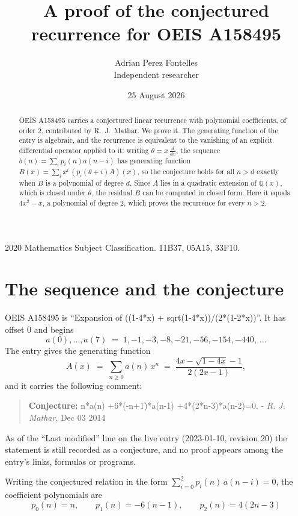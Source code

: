 \documentclass[11pt,a4paper]{article}
\title{A proof of the conjectured recurrence for OEIS A158495}
\author{Adrian Perez Fontelles\\ \small Independent researcher}
\date{25 August 2026}
\theoremstyle{plain}
\theoremstyle{definition}
\begin{document}
\maketitle

\begin{abstract}
OEIS A158495 carries a conjectured linear recurrence with polynomial coefficients, of
order 2, contributed by R.~J.~Mathar. We prove it. The generating function of the
entry is algebraic, and the recurrence is equivalent to the vanishing of an explicit
differential operator applied to it: writing $\theta=x\,\frac{d}{dx}$, the sequence
$b(n)=\sum_{i}p_{i}(n)a(n-i)$ has generating function
$B(x)=\sum_{i}x^{i}\,(p_{i}(\theta+i)A)(x)$, so the conjecture holds for all $n>d$ exactly
when $B$ is a polynomial of degree $d$. Since $A$ lies in a quadratic extension of
$\mathbb{Q}(x)$, which is closed under $\theta$, the residual $B$ can be computed in
closed form. Here it equals $4 x^{2} - x$, a polynomial of degree $2$, which proves
the recurrence for every $n>2$.
\end{abstract}

\noindent\small 2020 Mathematics Subject Classification. 11B37, 05A15, 33F10.\normalsize

\section{The sequence and the conjecture}

OEIS A158495 is ``Expansion of ((1-4*x) + sqrt(1-4*x))/(2*(1-2*x))''. It has offset $0$ and begins
\[
a(0),\dots,a(7)\;=\;1, -1, -3, -8, -21, -56, -154, -440,\ \dots
\]
The entry gives the generating function
\begin{equation}\label{eq:gf}
A(x)\;=\;\sum_{n\ge 0} a(n)\,x^{n}\;=\;\frac{4 x - \sqrt{1 - 4 x} - 1}{2 \left(2 x - 1\right)} ,
\end{equation}
and it carries the following comment:
\begin{quote}\small
\textbf{Conjecture:} n*a(n) +6*(-n+1)*a(n-1) +4*(2*n-3)*a(n-2)=0. - \emph{R. J. Mathar}, Dec 03 2014
\end{quote}
As of the ``Last modified'' line on the live entry (2023-01-10, revision 20) the
statement is still recorded as a conjecture, and no proof appears among the entry's links,
formulas or programs.

Writing the conjectured relation in the form $\sum_{i=0}^{2}p_{i}(n)\,a(n-i)=0$,
the coefficient polynomials are
\[
p_{0}(n)=n,\qquad p_{1}(n)=- 6 \left(n - 1\right),\qquad p_{2}(n)=4 \left(2 n - 3\right)
\]
\end{document}
